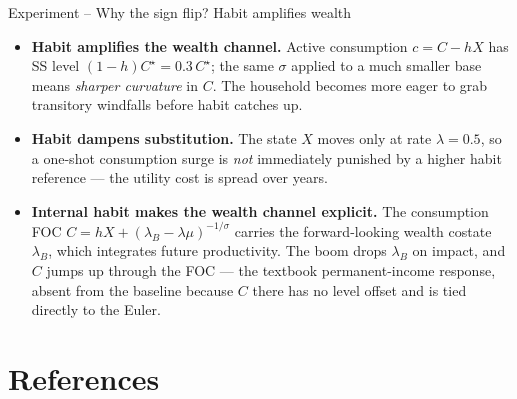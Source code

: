 \documentclass[11pt,aspectratio=169]{beamer}
\begin{document}
\begin{frame}{Experiment -- Why the sign flip? Habit amplifies wealth}

\begin{itemize}

\item \textbf{Habit amplifies the wealth channel.} Active consumption
  $c = C - hX$ has SS level $(1-h)C^\star = 0.3\,C^\star$; the same $\sigma$
  applied to a much smaller base means \emph{sharper curvature} in $C$.
  The household becomes more eager to grab transitory windfalls before
  habit catches up.\newline

\item \textbf{Habit dampens substitution.} The state $X$ moves only at
  rate $\lambda = 0.5$, so a one-shot consumption surge is \emph{not}
  immediately punished by a higher habit reference --- the utility cost
  is spread over years.\newline

\item \textbf{Internal habit makes the wealth channel explicit.} The
  consumption FOC $C = hX + (\lambda_B - \lambda\mu)^{-1/\sigma}$
  carries the forward-looking wealth costate $\lambda_B$, which
  integrates future productivity. The boom drops $\lambda_B$ on impact,
  and $C$ jumps up through the FOC --- the textbook permanent-income
  response, absent from the baseline because $C$ there has no level
  offset and is tied directly to the Euler.

\end{itemize}

\end{frame}

\section*{References}
\end{document}
